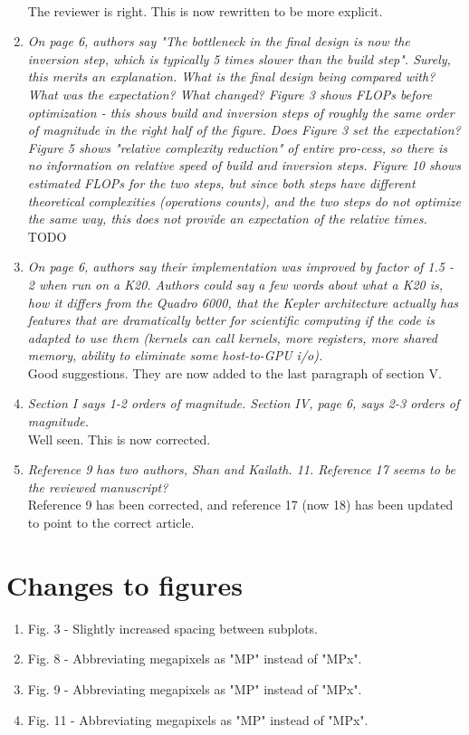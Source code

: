 \documentclass[11pt]{article} %
\newcommand\1{\vec 1}
\newcommand\q[1]{\textit{#1}}
\newcommand\qi[1]{\item\q{#1}}
\newcommand\ans[1]{#1}
\newcommand\ai[1]{\\[.5\baselineskip]\ans{#1}}
\begin{document}
\begin{enumerate}
\ai{The reviewer is right. This is now rewritten to be more explicit.}
%
\qi{On page 6, authors say "The bottleneck in the final design is now the inversion step, which is typically 5 times slower than the build step". Surely, this merits an explanation. What is the final design being compared with? What was the expectation? What changed? Figure 3 shows FLOPs before optimization - this shows build and inversion steps of roughly the same order of magnitude in the right half of the figure. Does Figure 3 set the expectation? Figure 5 shows "relative complexity reduction" of entire pro-cess, so there is no information on relative speed of build and inversion steps. Figure 10 shows estimated FLOPs for the two steps, but since both steps have different theoretical complexities (operations counts), and the two steps do not optimize the same way, this does not provide an expectation of the relative times.}
\ai{TODO}
\qi{On page 6, authors say their implementation was improved by factor of 1.5 - 2 when run on a K20. Authors could say a few words about what a K20 is, how it differs from the Quadro 6000, that the Kepler architecture actually has features that are dramatically better for scientific computing if the code is adapted to use them (kernels can call kernels, more registers, more shared memory, ability to eliminate some host-to-GPU i/o).}
\ai{Good suggestions. They are now added to the last paragraph of section V.}
\qi{Section I says 1-2 orders of magnitude. Section IV, page 6, says 2-3 orders of magnitude.}
\ai{Well seen. This is now corrected.}
\qi{Reference 9 has two authors, Shan and Kailath. 11. Reference 17 seems to be the reviewed manuscript?}
\ai{Reference 9 has been corrected, and reference 17 (now 18) has been updated to point to the correct article. }
\end{enumerate}

\newpage
\section{Changes to figures}

\begin{enumerate}
\item Fig. 3 - Slightly increased spacing between subplots.
\item Fig. 8 - Abbreviating megapixels as "MP" instead of "MPx".
\item Fig. 9 - Abbreviating megapixels as "MP" instead of "MPx".
\item Fig. 11 - Abbreviating megapixels as "MP" instead of "MPx".
\end{enumerate}
\end{document}
